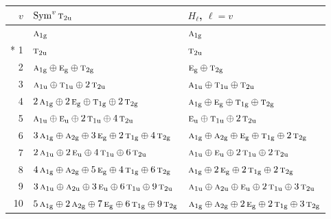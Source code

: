 \documentclass[10pt,a4paper]{article}
\numberwithin{equation}{section}
\newcommand{\irr}[1]{\text{\normalfont\scshape #1}}
\newcommand{\ptag}[1]{\mathrm{#1}}
\begin{document}
{\small\begin{longtable}{@{}rll@{}}\toprule
$v$ & $\operatorname{Sym}^{v}\irr{t}_{2\ptag{u}}$ & $H_\ell$, $\ell = v$\\\midrule\endhead
\bottomrule\endfoot\endlastfoot
0 & $\irr{a}_{1\ptag{g}}$ & $\irr{a}_{1\ptag{g}}$\\*
1 & $\irr{t}_{2\ptag{u}}$ & $\irr{t}_{2\ptag{u}}$\\
2 & $\irr{a}_{1\ptag{g}} \oplus \irr{e}_{\ptag{g}} \oplus \irr{t}_{2\ptag{g}}$ & $\irr{e}_{\ptag{g}} \oplus \irr{t}_{2\ptag{g}}$\\
3 & $\irr{a}_{1\ptag{u}} \oplus \irr{t}_{1\ptag{u}} \oplus 2\,\irr{t}_{2\ptag{u}}$ & $\irr{a}_{1\ptag{u}} \oplus \irr{t}_{1\ptag{u}} \oplus \irr{t}_{2\ptag{u}}$\\
4 & $2\,\irr{a}_{1\ptag{g}} \oplus 2\,\irr{e}_{\ptag{g}} \oplus \irr{t}_{1\ptag{g}} \oplus 2\,\irr{t}_{2\ptag{g}}$ & $\irr{a}_{1\ptag{g}} \oplus \irr{e}_{\ptag{g}} \oplus \irr{t}_{1\ptag{g}} \oplus \irr{t}_{2\ptag{g}}$\\
5 & $\irr{a}_{1\ptag{u}} \oplus \irr{e}_{\ptag{u}} \oplus 2\,\irr{t}_{1\ptag{u}} \oplus 4\,\irr{t}_{2\ptag{u}}$ & $\irr{e}_{\ptag{u}} \oplus \irr{t}_{1\ptag{u}} \oplus 2\,\irr{t}_{2\ptag{u}}$\\
6 & $3\,\irr{a}_{1\ptag{g}} \oplus \irr{a}_{2\ptag{g}} \oplus 3\,\irr{e}_{\ptag{g}} \oplus 2\,\irr{t}_{1\ptag{g}} \oplus 4\,\irr{t}_{2\ptag{g}}$ & $\irr{a}_{1\ptag{g}} \oplus \irr{a}_{2\ptag{g}} \oplus \irr{e}_{\ptag{g}} \oplus \irr{t}_{1\ptag{g}} \oplus 2\,\irr{t}_{2\ptag{g}}$\\
7 & $2\,\irr{a}_{1\ptag{u}} \oplus 2\,\irr{e}_{\ptag{u}} \oplus 4\,\irr{t}_{1\ptag{u}} \oplus 6\,\irr{t}_{2\ptag{u}}$ & $\irr{a}_{1\ptag{u}} \oplus \irr{e}_{\ptag{u}} \oplus 2\,\irr{t}_{1\ptag{u}} \oplus 2\,\irr{t}_{2\ptag{u}}$\\
8 & $4\,\irr{a}_{1\ptag{g}} \oplus \irr{a}_{2\ptag{g}} \oplus 5\,\irr{e}_{\ptag{g}} \oplus 4\,\irr{t}_{1\ptag{g}} \oplus 6\,\irr{t}_{2\ptag{g}}$ & $\irr{a}_{1\ptag{g}} \oplus 2\,\irr{e}_{\ptag{g}} \oplus 2\,\irr{t}_{1\ptag{g}} \oplus 2\,\irr{t}_{2\ptag{g}}$\\
9 & $3\,\irr{a}_{1\ptag{u}} \oplus \irr{a}_{2\ptag{u}} \oplus 3\,\irr{e}_{\ptag{u}} \oplus 6\,\irr{t}_{1\ptag{u}} \oplus 9\,\irr{t}_{2\ptag{u}}$ & $\irr{a}_{1\ptag{u}} \oplus \irr{a}_{2\ptag{u}} \oplus \irr{e}_{\ptag{u}} \oplus 2\,\irr{t}_{1\ptag{u}} \oplus 3\,\irr{t}_{2\ptag{u}}$\\
10 & $5\,\irr{a}_{1\ptag{g}} \oplus 2\,\irr{a}_{2\ptag{g}} \oplus 7\,\irr{e}_{\ptag{g}} \oplus 6\,\irr{t}_{1\ptag{g}} \oplus 9\,\irr{t}_{2\ptag{g}}$ & $\irr{a}_{1\ptag{g}} \oplus \irr{a}_{2\ptag{g}} \oplus 2\,\irr{e}_{\ptag{g}} \oplus 2\,\irr{t}_{1\ptag{g}} \oplus 3\,\irr{t}_{2\ptag{g}}$\\

\end{longtable}}
\end{document}
